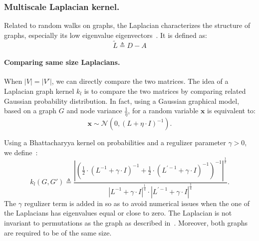         \subsubsection{Multiscale Laplacian kernel.}
            Related to random walks on graphs, the Laplacian characterizes the structure of graphs, especially its low eigenvalue eigenvectors~\parencite{kondor2016multiscale}.
            It is defined as:
            \begin{equation}
                \label{eq::laplacian_graph}
                \widetilde{L} \triangleq D - A
            \end{equation}

            \paragraph{Comparing same size Laplacians.}
                When $\vert V \vert = \vert V' \vert$, we can directly compare the two matrices.
                The idea of a Laplacian graph kernel $k_{l}$ is to compare the two matrices by comparing related Gaussian probability distribution.
                In fact, using a Gaussian graphical model, based on a graph $G$ and node variance $\frac{1}{\eta}$, for a random variable $\bm{x}$ is equivalent to:
                \begin{equation}
                    \label{eq::guassian_gm}
                    \bm{x} \sim \mathscr{N}\left(0, \left(L + \eta \cdot I\right)^{-1}\right).
                \end{equation}

                Using a Bhattacharyya kernel on probabilities and a regulizer parameter $\gamma>0$, we define~\parencite{kondor2016multiscale}:
                \begin{equation}
                    \label{eq::laplacian_kernel}
                    k_{l}(G, G') \triangleq \frac{\left\lvert \left(\frac{1}{2} \cdot \left(L^{-1}+\gamma\cdot I\right)^{-1} + \frac{1}{2} \cdot \left(L^{\prime -1}+\gamma\cdot I\right)^{-1} \right)^{-1} \right\rvert^{\frac{1}{2}}}{\left\lvert L^{-1} + \gamma \cdot I\right\rvert^{\frac{1}{4}}\cdot\left\lvert L^{\prime -1} + \gamma \cdot I\right\rvert^{\frac{1}{4}}}.
                \end{equation}
                The \(\gamma\) regulizer term is added in so as to avoid numerical issues when the one of the Laplacians has eigenvalues equal or close to zero.
                The Laplacian is not invariant to permutations as the graph as described in~\textcite{kondor2016multiscale}.
                Moreover, both graphs are required to be of the same size.\\

